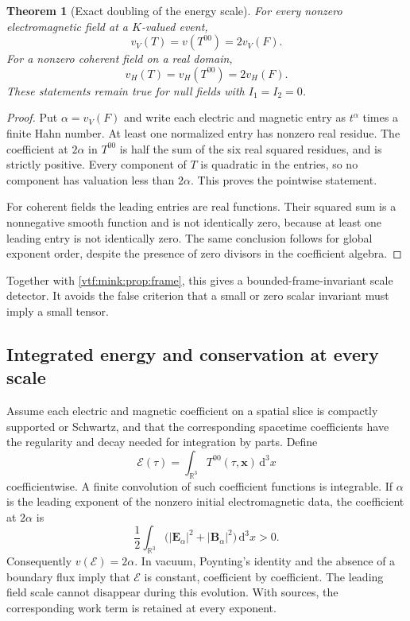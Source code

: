\documentclass[11pt,letterpaper]{article}
\newtheorem{theorem}{Theorem}[section]
\theoremstyle{definition}
\theoremstyle{remark}
\newcommand{\R}{\mathbb R}\newcommand{\C}{\mathbb C}
\newcommand{\vH}{v_{\!H}}
\newcommand{\dd}{\mathrm d}
\begin{document}
\begin{theorem}[Exact doubling of the energy scale]\label{vtf:mink:thm:energyscale}
For every nonzero electromagnetic field at a $K$-valued event,
\begin{equation}\label{vtf:mink:eq:energyscale}
 v_V(T)=v(T^{00})=2v_V(F).
\end{equation}
For a nonzero coherent field on a real domain,
\begin{equation}
 \vH(T)=\vH(T^{00})=2\vH(F).
\end{equation}
These statements remain true for null fields with $I_1=I_2=0$.
\end{theorem}
\begin{proof}
Put $\alpha=v_V(F)$ and write each electric and magnetic entry as $t^\alpha$ times a finite Hahn number. At least one normalized entry has nonzero real residue. The coefficient at $2\alpha$ in $T^{00}$ is half the sum of the six real squared residues, and is strictly positive. Every component of $T$ is quadratic in the entries, so no component has valuation less than $2\alpha$. This proves the pointwise statement.

For coherent fields the leading entries are real functions. Their squared sum is a nonnegative smooth function and is not identically zero, because at least one leading entry is not identically zero. The same conclusion follows for global exponent order, despite the presence of zero divisors in the coefficient algebra.
\end{proof}
Together with \cref{vtf:mink:prop:frame}, this gives a bounded-frame-invariant scale detector. It avoids the false criterion that a small or zero scalar invariant must imply a small tensor.

\subsection{Integrated energy and conservation at every scale}
Assume each electric and magnetic coefficient on a spatial slice is compactly supported or Schwartz, and that the corresponding spacetime coefficients have the regularity and decay needed for integration by parts. Define
\begin{equation}
 \mathscr E(\tau)=\int_{\R^3}T^{00}(\tau,\mathbf x)\,\dd^3x
\end{equation}
coefficientwise. A finite convolution of such coefficient functions is integrable. If $\alpha$ is the leading exponent of the nonzero initial electromagnetic data, the coefficient at $2\alpha$ is
\begin{equation}
 \frac12\int_{\R^3}
 \bigl(|\mathbf E_\alpha|^2+|\mathbf B_\alpha|^2\bigr)\,\dd^3x>0.
\end{equation}
Consequently $v(\mathscr E)=2\alpha$. In vacuum, Poynting's identity and the absence of a boundary flux imply that $\mathscr E$ is constant, coefficient by coefficient. The leading field scale cannot disappear during this evolution. With sources, the corresponding work term is retained at every exponent.
\end{document}
